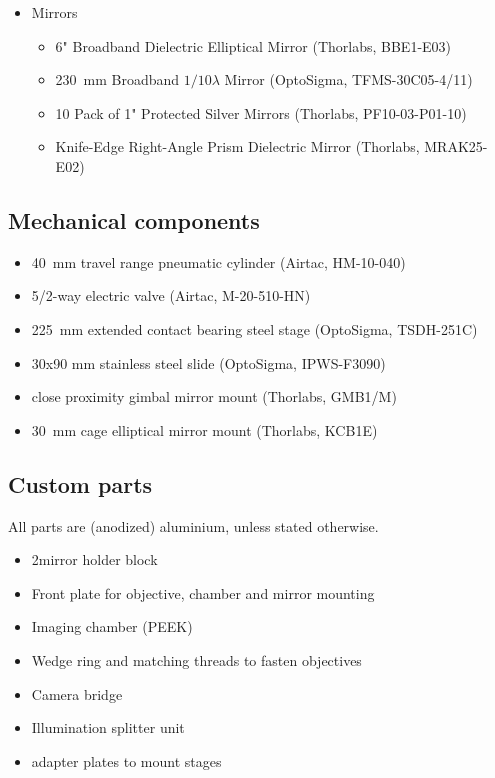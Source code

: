 \begin{singlespace}
\begin{itemize}
\begin{itemize}
    \end{itemize}
    \item Mirrors
    \begin{itemize}
      \item 6" Broadband Dielectric Elliptical Mirror (Thorlabs, BBE1-E03)
      \item 2\texttimes \SI{30}{mm} Broadband $1/10 \lambda$ Mirror (OptoSigma, TFMS-30C05-4/11)
      \item 10 Pack of 1" Protected Silver Mirrors (Thorlabs, PF10-03-P01-10)
      \item Knife-Edge Right-Angle Prism Dielectric Mirror (Thorlabs, MRAK25-E02)
    \end{itemize}
  \end{itemize}

\subsection*{Mechanical components}
  \begin{itemize}
    \item \SI{40}{mm} travel range pneumatic cylinder (Airtac, HM-10-040)
    \item 5/2-way electric valve (Airtac, M-20-510-HN)
    \item 2\texttimes \SI{25}{mm} extended contact bearing steel stage (OptoSigma,  TSDH-251C)
    \item 30x90 mm stainless steel slide (OptoSigma,  IPWS-F3090)
    \item close proximity gimbal mirror mount (Thorlabs, GMB1/M)
    \item \SI{30}{mm} cage elliptical mirror mount (Thorlabs, KCB1E)
  \end{itemize}

\subsection*{Custom parts}
  All parts are (anodized) aluminium, unless stated otherwise.
  \begin{itemize}
    \item 2\texttimes mirror holder block
    \item Front plate for objective, chamber and mirror mounting
    \item Imaging chamber (PEEK)
    \item Wedge ring and matching threads to fasten objectives
    \item Camera bridge
    \item Illumination splitter unit
    \item adapter plates to mount stages
  \end{itemize}


\end{singlespace}
